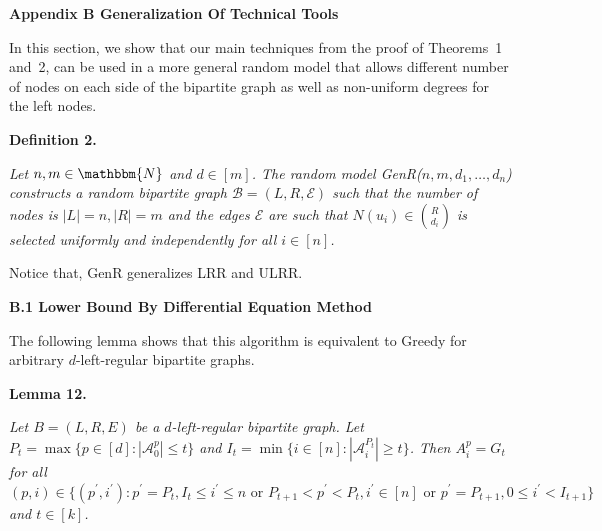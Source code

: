 \documentclass[10pt,a4paper]{article}
\begin{document}
\par\medskip\noindent\textbf{Appendix B Generalization Of Technical Tools}\par




In this section, we show that our main techniques from the proof of Theorems 1 and 2, can be used in a more general random model that allows different number of nodes on each side of the bipartite graph as well as non-uniform degrees for the left nodes.\par





\par\medskip\noindent\textbf{\textbf{Definition 2}\textbf{.}}\par



\emph{Let $n,m\in\mathbbm{N}$ and $d\in[m]$. The random model GenR($n,m,d_{1},\dots,d_{n}$) constructs a random bipartite graph $\mathcal{B}=\left(L,R,\mathcal{E}\right)$ such that the number of nodes is $|L|=n,|R|=m$ and the edges $\mathcal{E}$ are such that $N(u_{i})\in\binom{R}{d_{i}}$ is selected uniformly and independently for all $i\in[n]$.}\par






Notice that, GenR generalizes LRR and ULRR.\par




\par\medskip\noindent\textbf{B.1 Lower Bound By Differential Equation Method}\par




The following lemma shows that this algorithm is equivalent to Greedy for arbitrary $d$-left-regular bipartite graphs.\par





\par\medskip\noindent\textbf{\textbf{Lemma 12}\textbf{.}}\par



\emph{Let $B=(L,R,E)$ be a $d$-left-regular bipartite graph.
Let $P_{t}=\max\{p\in[d]:|\mathcal{A}^{p}_{0}|\leq t\}$
and $I_{t}=\min\{i\in[n]:|\mathcal{A}^{P_{t}}_{i}|\geq t\}$.
Then $A^{p}_{i}=G_{t}$ for all $(p,i)\in\{(p^{\prime},i^{\prime}):p^{\prime}=P_{t},I_{t}\leq i^{\prime}\leq n\text{ or }P_{t+1}<p^{\prime}<P_{t},i^{\prime}\in[n]\text{ or }p^{\prime}=P_{t+1},0\leq i^{\prime}<I_{t+1}\}$ and $t\in[k]$.}\par
\end{document}

